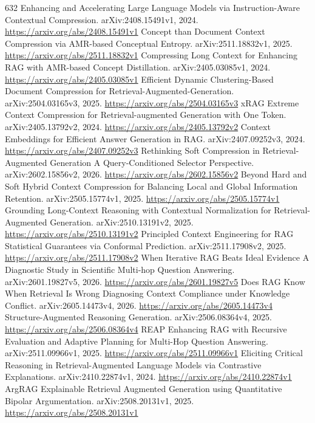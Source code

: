 \documentclass[11pt]{article}
\begin{document}
\begin{thebibliography}{632}
 Enhancing and Accelerating Large Language Models via Instruction-Aware Contextual Compression. arXiv:2408.15491v1, 2024. \url{https://arxiv.org/abs/2408.15491v1}
 Concept than Document Context Compression via AMR-based Conceptual Entropy. arXiv:2511.18832v1, 2025. \url{https://arxiv.org/abs/2511.18832v1}
 Compressing Long Context for Enhancing RAG with AMR-based Concept Distillation. arXiv:2405.03085v1, 2024. \url{https://arxiv.org/abs/2405.03085v1}
 Efficient Dynamic Clustering-Based Document Compression for Retrieval-Augmented-Generation. arXiv:2504.03165v3, 2025. \url{https://arxiv.org/abs/2504.03165v3}
 xRAG Extreme Context Compression for Retrieval-augmented Generation with One Token. arXiv:2405.13792v2, 2024. \url{https://arxiv.org/abs/2405.13792v2}
 Context Embeddings for Efficient Answer Generation in RAG. arXiv:2407.09252v3, 2024. \url{https://arxiv.org/abs/2407.09252v3}
 Rethinking Soft Compression in Retrieval-Augmented Generation A Query-Conditioned Selector Perspective. arXiv:2602.15856v2, 2026. \url{https://arxiv.org/abs/2602.15856v2}
 Beyond Hard and Soft Hybrid Context Compression for Balancing Local and Global Information Retention. arXiv:2505.15774v1, 2025. \url{https://arxiv.org/abs/2505.15774v1}
 Grounding Long-Context Reasoning with Contextual Normalization for Retrieval-Augmented Generation. arXiv:2510.13191v2, 2025. \url{https://arxiv.org/abs/2510.13191v2}
 Principled Context Engineering for RAG Statistical Guarantees via Conformal Prediction. arXiv:2511.17908v2, 2025. \url{https://arxiv.org/abs/2511.17908v2}
 When Iterative RAG Beats Ideal Evidence A Diagnostic Study in Scientific Multi-hop Question Answering. arXiv:2601.19827v5, 2026. \url{https://arxiv.org/abs/2601.19827v5}
 Does RAG Know When Retrieval Is Wrong Diagnosing Context Compliance under Knowledge Conflict. arXiv:2605.14473v4, 2026. \url{https://arxiv.org/abs/2605.14473v4}
 Structure-Augmented Reasoning Generation. arXiv:2506.08364v4, 2025. \url{https://arxiv.org/abs/2506.08364v4}
 REAP Enhancing RAG with Recursive Evaluation and Adaptive Planning for Multi-Hop Question Answering. arXiv:2511.09966v1, 2025. \url{https://arxiv.org/abs/2511.09966v1}
 Eliciting Critical Reasoning in Retrieval-Augmented Language Models via Contrastive Explanations. arXiv:2410.22874v1, 2024. \url{https://arxiv.org/abs/2410.22874v1}
 ArgRAG Explainable Retrieval Augmented Generation using Quantitative Bipolar Argumentation. arXiv:2508.20131v1, 2025. \url{https://arxiv.org/abs/2508.20131v1}

\end{thebibliography}
\end{document}
